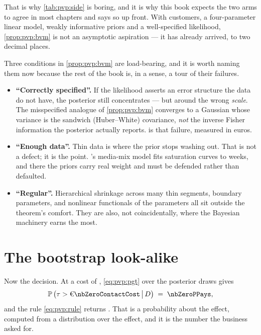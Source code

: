That is why \cref{tab:pvp:side} is boring, and it is why this book expects the two arms to agree
in most chapters and says so up front. With \nbZeroNCustomers{} customers, a four-parameter linear
model, weakly informative priors and a well-specified likelihood, \cref{prop:pvp:bvm} is not an
asymptotic aspiration --- it has already arrived, to two decimal places.

Three conditions in \cref{prop:pvp:bvm} are load-bearing, and it is worth naming them now because
the rest of the book is, in a sense, a tour of their failures.

\begin{itemize}[leftmargin=*]
  \item \textbf{``Correctly specified''.} If the likelihood asserts an error structure the data do
        not have, the posterior still concentrates --- but around the wrong \emph{scale}. The
        misspecified analogue of \cref{prop:pvp:bvm} \citep{kleijn2012} converges to a Gaussian
        whose variance is the sandwich (Huber--White) covariance, \emph{not} the inverse Fisher
        information the posterior actually reports.  is that failure, measured
        in euros.
  \item \textbf{``Enough data''.} Thin data is where the prior stops washing out. That is not a
        defect; it is the point. 's media-mix model fits saturation curves to
        \nbSixNWeeks{} weeks, and there the priors carry real weight and must be defended rather
        than defaulted.
  \item \textbf{``Regular''.} Hierarchical shrinkage across many thin segments,
        boundary parameters, and nonlinear functionals of the parameters all sit outside the
        theorem's comfort. They are also, not coincidentally, where the Bayesian machinery earns
        the most.
\end{itemize}

\section{The bootstrap look-alike}
\label{sec:pvp:bootstrap}

Now the decision. At a cost of \eur{\nbZeroContactCost}, \cref{eq:pvp:pgt} over the posterior
draws gives
%
\begin{equation}
  \Prob\big(\tau > \eur{\nbZeroContactCost} \,\big|\, D\big) \;=\; \nbZeroPPays ,
  \label{eq:pvp:ppays}
\end{equation}
%
and the rule \cref{eq:pvp:rule} returns \textbf{\nbZeroVerdict}. That is a probability about the
effect, computed from a distribution over the effect, and it is the number the business asked for.

